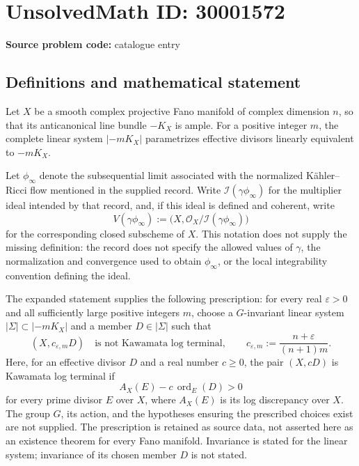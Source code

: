 \documentclass[11pt]{article}
\begin{document}
\section*{UnsolvedMath ID: 30001572}
\textbf{Source problem code:} catalogue entry
\subsection{Definitions and mathematical statement}
Let \(X\) be a smooth complex projective Fano manifold of complex dimension \(n\), so that its anticanonical line bundle \(-K_X\) is ample. For a positive integer \(m\), the complete linear system \(|-mK_X|\) parametrizes effective divisors linearly equivalent to \(-mK_X\).

Let \(\phi_\infty\) denote the subsequential limit associated with the normalized Kähler--Ricci flow mentioned in the supplied record. Write \(\mathcal I(\gamma\phi_\infty)\) for the multiplier ideal intended by that record, and, if this ideal is defined and coherent, write
\[
V(\gamma\phi_\infty)
:=\bigl(X,\mathcal O_X/\mathcal I(\gamma\phi_\infty)\bigr)
\]
for the corresponding closed subscheme of \(X\). This notation does not supply the missing definition: the record does not specify the allowed values of \(\gamma\), the normalization and convergence used to obtain \(\phi_\infty\), or the local integrability convention defining the ideal.

The expanded statement supplies the following prescription: for every real \(\varepsilon>0\) and all sufficiently large positive integers \(m\), choose a \(G\)-invariant linear system \(|\Sigma|\subset|-mK_X|\) and a member \(D\in|\Sigma|\) such that
\[
\left(X,c_{\varepsilon,m}D\right)
\quad\text{is not Kawamata log terminal},
\qquad
c_{\varepsilon,m}:=\frac{n+\varepsilon}{(n+1)m}.
\]
Here, for an effective divisor \(D\) and a real number \(c\geq0\), the pair \((X,cD)\) is Kawamata log terminal if
\[
A_X(E)-c\,\operatorname{ord}_E(D)>0
\]
for every prime divisor \(E\) over \(X\), where \(A_X(E)\) is its log discrepancy over \(X\). The group \(G\), its action, and the hypotheses ensuring the prescribed choices exist are not supplied. The prescription is retained as source data, not asserted here as an existence theorem for every Fano manifold. Invariance is stated for the linear system; invariance of its chosen member \(D\) is not stated.
\end{document}
